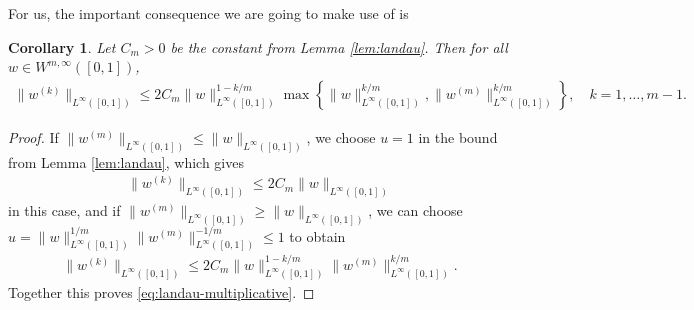 \documentclass[11pt,a4paper,reqno]{amsart}
\theoremstyle{plain}
\newtheorem{corollary}[proposition]{Corollary}
\theoremstyle{definition}
\begin{document}
For us, the important consequence we are going to make use of is
\begin{corollary}\label{cor:landau}
	Let $C_m>0$ be the constant from Lemma \ref{lem:landau}. Then for all $w\in W^{m,\infty}([0,1])$,
	\begin{align}\label{eq:landau-multiplicative}
		\|w^{(k)}\|_{L^{\infty}([0,1])} \leq 2C_m \|w\|_{L^{\infty}([0,1])}^{1-k/m} \max\left\{\|w\|_{L^{\infty}([0,1])}^{k/m}, \|w^{(m)}\|_{L^{\infty}([0,1])}^{k/m} \right\}, \quad k=1, \dots, m-1.
	\end{align}
\end{corollary}
\begin{proof}
	If $\|w^{(m)}\|_{L^{\infty}([0,1])} \leq \|w\|_{L^{\infty}([0,1])}$, we choose $u=1$ in the bound from Lemma \ref{lem:landau}, which gives
	\begin{align*}
		\|w^{(k)}\|_{L^{\infty}([0,1])} \leq 2 C_m \|w\|_{L^{\infty}([0,1])}
	\end{align*}
	in this case, and  if $\|w^{(m)}\|_{L^{\infty}([0,1])} \geq \|w\|_{L^{\infty}([0,1])}$, we can choose $u = \|w\|_{L^{\infty}([0,1])}^{1/m} \|w^{(m)}\|_{L^{\infty}([0,1])}^{-1/m} \leq 1$ to obtain
	\begin{align*}
		\|w^{(k)}\|_{L^{\infty}([0,1])} \leq 2 C_m \|w\|_{L^{\infty}([0,1])}^{1-k/m} \|w^{(m)}\|_{L^{\infty}([0,1])}^{k/m}.
	\end{align*}
	Together this proves \eqref{eq:landau-multiplicative}.
\end{proof}
\end{document}
